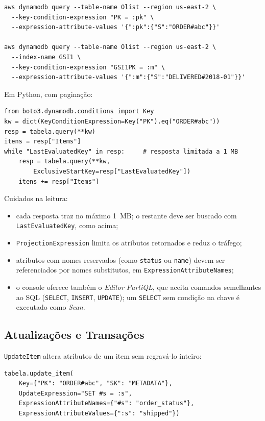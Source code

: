\documentclass[12pt]{article}
\begin{document}
{\footnotesize
\begin{verbatim}
aws dynamodb query --table-name Olist --region us-east-2 \
  --key-condition-expression "PK = :pk" \
  --expression-attribute-values '{":pk":{"S":"ORDER#abc"}}'

aws dynamodb query --table-name Olist --region us-east-2 \
  --index-name GSI1 \
  --key-condition-expression "GSI1PK = :m" \
  --expression-attribute-values '{":m":{"S":"DELIVERED#2018-01"}}'
\end{verbatim}
}

Em Python, com paginação:

{\footnotesize
\begin{verbatim}
from boto3.dynamodb.conditions import Key
kw = dict(KeyConditionExpression=Key("PK").eq("ORDER#abc"))
resp = tabela.query(**kw)
itens = resp["Items"]
while "LastEvaluatedKey" in resp:     # resposta limitada a 1 MB
    resp = tabela.query(**kw,
        ExclusiveStartKey=resp["LastEvaluatedKey"])
    itens += resp["Items"]
\end{verbatim}
}

Cuidados na leitura:

\begin{itemize}
  \item cada resposta traz no máximo 1~MB; o restante deve ser buscado com
  \texttt{LastEvaluatedKey}, como acima;
  \item \texttt{ProjectionExpression} limita os atributos retornados e reduz
  o tráfego;
  \item atributos com nomes reservados (como \texttt{status} ou
  \texttt{name}) devem ser referenciados por nomes substitutos, em
  \texttt{ExpressionAttributeNames};
  \item o console oferece também o \textit{Editor PartiQL}, que aceita
  comandos semelhantes ao SQL (\texttt{SELECT}, \texttt{INSERT},
  \texttt{UPDATE}); um \texttt{SELECT} sem condição na chave é executado
  como \textit{Scan}.
\end{itemize}

\subsection{Atualizações e Transações}

\texttt{UpdateItem} altera atributos de um item sem regravá-lo inteiro:

{\footnotesize
\begin{verbatim}
tabela.update_item(
    Key={"PK": "ORDER#abc", "SK": "METADATA"},
    UpdateExpression="SET #s = :s",
    ExpressionAttributeNames={"#s": "order_status"},
    ExpressionAttributeValues={":s": "shipped"})
\end{verbatim}
}
\end{document}

